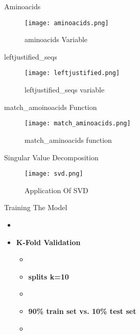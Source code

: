 \documentclass[14pt]{beamer}
\begin{document}
\begin{frame}{Aminoacids}
    \begin{figure}
        \centering
        \texttt{[image: aminoacids.png]}
        \caption{aminoacids Variable}
        \label{fig:enter-label}
    \end{figure}
\end{frame}

\begin{frame}{leftjustified\_seqs}
    \begin{figure}
        \centering
        \texttt{[image: leftjustified.png]}
        \caption{leftjustified\_seqs variable}
        \label{fig:enter-label}
    \end{figure}
\end{frame}

\begin{frame}{match\_amoinoacids Function}
    \begin{figure}
        \centering
        \texttt{[image: match\_aminoacids.png]}
        \caption{match\_aminoacids function}
        \label{fig:enter-label}
    \end{figure}
   \end{frame}

\begin{frame}{Singular Value Decomposition}
    \begin{figure}
        \centering
        \texttt{[image: svd.png]}
        \caption{Application Of SVD}
        \label{fig:enter-label}
    \end{figure}
\end{frame}



\begin{frame}{Training The Model}
    \begin{itemize}
    \item
    \item\color{colorblue}\largetext\textbf{K-Fold Validation}
        \begin{itemize}
         \item
         \item\color{colorgreen}\largetext\textbf{splits k=10}
         \item
         \item\begin{center}\largetext\textbf{90\% train set vs. 10\% test set}\end{center} 
         \item
         \end{itemize}
 \end{itemize}
 \end{frame}
\end{document}
